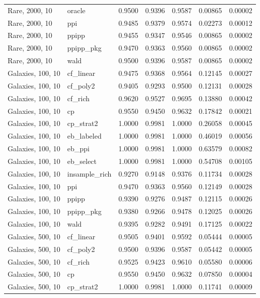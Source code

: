 \begin{longtable}{llrrrrr}
Rare, 2000, 10 & oracle & 0.9500 & 0.9396 & 0.9587 & 0.00865 & 0.00002 \\
Rare, 2000, 10 & ppi & 0.9485 & 0.9379 & 0.9574 & 0.02273 & 0.00012 \\
Rare, 2000, 10 & ppipp & 0.9455 & 0.9347 & 0.9546 & 0.00865 & 0.00002 \\
Rare, 2000, 10 & ppipp\_pkg & 0.9470 & 0.9363 & 0.9560 & 0.00865 & 0.00002 \\
Rare, 2000, 10 & wald & 0.9500 & 0.9396 & 0.9587 & 0.00865 & 0.00002 \\
Galaxies, 100, 10 & cf\_linear & 0.9475 & 0.9368 & 0.9564 & 0.12145 & 0.00027 \\
Galaxies, 100, 10 & cf\_poly2 & 0.9405 & 0.9293 & 0.9500 & 0.12131 & 0.00028 \\
Galaxies, 100, 10 & cf\_rich & 0.9620 & 0.9527 & 0.9695 & 0.13880 & 0.00042 \\
Galaxies, 100, 10 & cp & 0.9550 & 0.9450 & 0.9632 & 0.17842 & 0.00021 \\
Galaxies, 100, 10 & cp\_strat2 & 1.0000 & 0.9981 & 1.0000 & 0.26058 & 0.00045 \\
Galaxies, 100, 10 & eb\_labeled & 1.0000 & 0.9981 & 1.0000 & 0.46019 & 0.00056 \\
Galaxies, 100, 10 & eb\_ppi & 1.0000 & 0.9981 & 1.0000 & 0.63579 & 0.00082 \\
Galaxies, 100, 10 & eb\_select & 1.0000 & 0.9981 & 1.0000 & 0.54708 & 0.00105 \\
Galaxies, 100, 10 & insample\_rich & 0.9270 & 0.9148 & 0.9376 & 0.11734 & 0.00028 \\
Galaxies, 100, 10 & ppi & 0.9470 & 0.9363 & 0.9560 & 0.12149 & 0.00028 \\
Galaxies, 100, 10 & ppipp & 0.9390 & 0.9276 & 0.9487 & 0.12115 & 0.00026 \\
Galaxies, 100, 10 & ppipp\_pkg & 0.9380 & 0.9266 & 0.9478 & 0.12025 & 0.00026 \\
Galaxies, 100, 10 & wald & 0.9395 & 0.9282 & 0.9491 & 0.17125 & 0.00022 \\
Galaxies, 500, 10 & cf\_linear & 0.9505 & 0.9401 & 0.9592 & 0.05444 & 0.00005 \\
Galaxies, 500, 10 & cf\_poly2 & 0.9500 & 0.9396 & 0.9587 & 0.05442 & 0.00005 \\
Galaxies, 500, 10 & cf\_rich & 0.9525 & 0.9423 & 0.9610 & 0.05580 & 0.00006 \\
Galaxies, 500, 10 & cp & 0.9550 & 0.9450 & 0.9632 & 0.07850 & 0.00004 \\
Galaxies, 500, 10 & cp\_strat2 & 1.0000 & 0.9981 & 1.0000 & 0.11741 & 0.00009 \\

\end{longtable}
